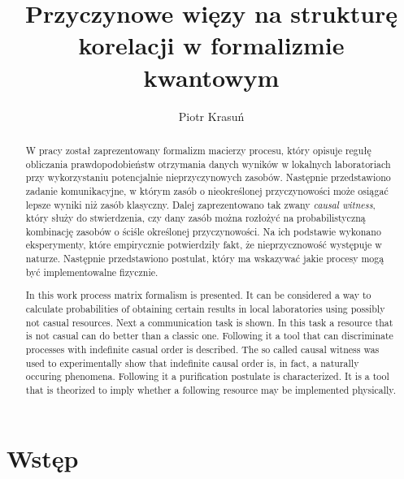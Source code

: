 \documentclass[10pt]{article} %
\title{Przyczynowe więzy na strukturę korelacji w formalizmie kwantowym}
\author{Piotr Krasuń}
\begin{document}
\maketitle

\newpage
\begin{abstract}
W pracy został zaprezentowany formalizm macierzy procesu, który opisuje regułę obliczania prawdopodobieństw otrzymania danych wyników w lokalnych laboratoriach przy wykorzystaniu potencjalnie nieprzyczynowych zasobów. Następnie przedstawiono zadanie komunikacyjne, w którym zasób o nieokreślonej przyczynowości może osiągać lepsze wyniki niż zasób klasyczny. Dalej zaprezentowano tak zwany \textit{causal witness}, który służy do stwierdzenia, czy dany zasób można rozłożyć na probabilistyczną kombinację zasobów o ściśle określonej przyczynowości. Na ich podstawie wykonano eksperymenty, które empirycznie potwierdziły fakt, że nieprzycznowość występuje w naturze. Następnie przedstawiono postulat, który ma wskazywać jakie procesy mogą być implementowalne fizycznie.
\end{abstract}
\renewcommand{\abstractname}{Abstract}
\begin{abstract}
In this work process matrix formalism is presented. It can be considered a way to calculate probabilities of obtaining certain results in local laboratories using possibly not casual resources. Next a communication task is shown. In this task a resource that is not casual can do better than a classic one. Following it a tool that can discriminate processes with indefinite casual order is described. The so called causal witness was used to experimentally show that indefinite causal order is, in fact, a naturally occuring phenomena. Following it a purification postulate is characterized. It is a tool that is theorized to imply whether a following resource may be implemented physically.
\end{abstract}
\section{Wstęp}
\end{document}
